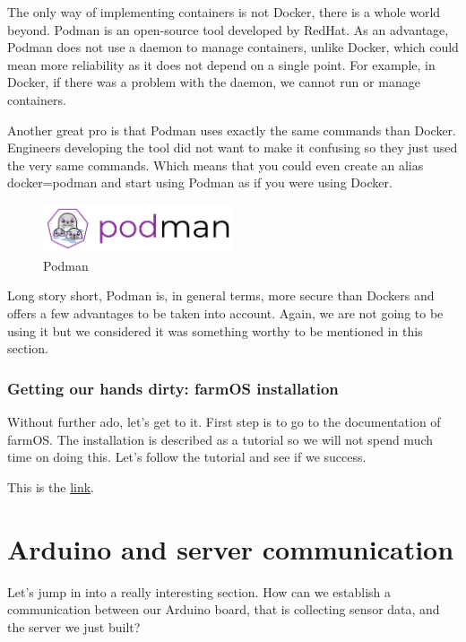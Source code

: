 The only way of implementing containers is not Docker, there is a whole world beyond. Podman is an open-source tool developed by RedHat. As an advantage, Podman does not use a daemon to manage containers, unlike Docker, which could mean more reliability as it does not depend on a single point. For example, in Docker, if there was a problem with the daemon, we cannot run or manage containers.

Another great pro is that Podman uses exactly the same commands than Docker. Engineers developing the tool did not want to make it confusing so they just used the very same commands. Which means that you could even create an alias docker=podman and start using Podman as if you were using Docker. 

\begin{figure}[H]
    \centering
    \includegraphics[width=0.5\textwidth]{fig/podman_logo.png}
        \caption{Podman}
    \label{fig:podman-logo}
\end{figure}


Long story short, Podman is, in general terms, more secure than Dockers and offers a few advantages to be taken into account. Again, we are not going to be using it but we considered it was something worthy to be mentioned in this section.

\subsubsection{Getting our hands dirty: farmOS installation}
Without further ado, let's get to it. First step is to go to the documentation of farmOS. The installation is described as a tutorial so we will not spend much time on doing this. Let's follow the tutorial and see if we success. 

This is the \href{https://farmos.org/hosting/docker/}{link}.



\section{Arduino and server communication}
Let's jump in into a really interesting section. How can we establish a communication between our Arduino board, that is collecting sensor data, and the server we just built?

